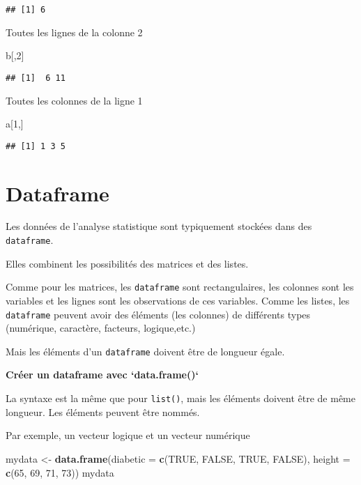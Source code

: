 \documentclass[]{book}
\newenvironment{Shaded}{\begin{snugshade}}{\end{snugshade}}
\newcommand{\DataTypeTok}[1]{\textcolor[rgb]{0.13,0.29,0.53}{#1}}
\newcommand{\DecValTok}[1]{\textcolor[rgb]{0.00,0.00,0.81}{#1}}
\newcommand{\KeywordTok}[1]{\textcolor[rgb]{0.13,0.29,0.53}{\textbf{#1}}}
\newcommand{\NormalTok}[1]{#1}
\newcommand{\OtherTok}[1]{\textcolor[rgb]{0.56,0.35,0.01}{#1}}
\newcommand{\StringTok}[1]{\textcolor[rgb]{0.31,0.60,0.02}{#1}}
\begin{document}
\begin{verbatim}
## [1] 6
\end{verbatim}

Toutes les lignes de la colonne 2

\begin{Shaded}
\begin{Highlighting}[]
\NormalTok{b[,}\DecValTok{2}\NormalTok{]}
\end{Highlighting}
\end{Shaded}

\begin{verbatim}
## [1]  6 11
\end{verbatim}

Toutes les colonnes de la ligne 1

\begin{Shaded}
\begin{Highlighting}[]
\NormalTok{a[}\DecValTok{1}\NormalTok{,]}
\end{Highlighting}
\end{Shaded}

\begin{verbatim}
## [1] 1 3 5
\end{verbatim}

\hypertarget{dataframe}{%
\section{Dataframe}\label{dataframe}}

Les données de l'analyse statistique sont typiquement stockées dans des \texttt{dataframe}.

Elles combinent les possibilités des matrices et des listes.

Comme pour les matrices, les \texttt{dataframe} sont rectangulaires, les colonnes sont les variables et les lignes sont les observations de ces variables.
Comme les listes, les \texttt{dataframe} peuvent avoir des éléments (les colonnes) de différents types (numérique, caractère, facteurs, logique,etc.)

Mais les éléments d'un \texttt{dataframe} doivent être de longueur égale.

\textbf{Créer un dataframe avec `data.frame()`}

La syntaxe est la même que pour \texttt{list()}, mais les éléments doivent être de même longueur.
Les éléments peuvent être nommés.

Par exemple, un vecteur logique et un vecteur numérique

\begin{Shaded}
\begin{Highlighting}[]
\NormalTok{mydata <-}\StringTok{ }\KeywordTok{data.frame}\NormalTok{(}\DataTypeTok{diabetic =} \KeywordTok{c}\NormalTok{(}\OtherTok{TRUE}\NormalTok{, }\OtherTok{FALSE}\NormalTok{, }\OtherTok{TRUE}\NormalTok{, }\OtherTok{FALSE}\NormalTok{), }
                     \DataTypeTok{height =} \KeywordTok{c}\NormalTok{(}\DecValTok{65}\NormalTok{, }\DecValTok{69}\NormalTok{, }\DecValTok{71}\NormalTok{, }\DecValTok{73}\NormalTok{))}
\NormalTok{mydata}
\end{Highlighting}
\end{Shaded}
\end{document}
